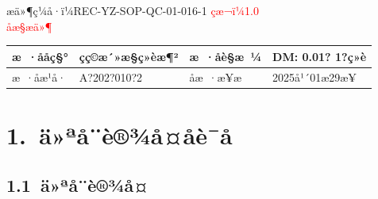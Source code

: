 \documentclass[UTF8,10pt,a4paper,fontset=fandol]{ctexart}
\renewcommand{\arraystretch}{1.15}
\newcommand{\fieldvalue}[1]{#1}
\newcommand{\handwritten}[1]{#1}
\begin{document}
\begin{center}
\begin{center}
\noindent
æä»¶ç¼å·ï¼REC-YZ-SOP-QC-01-016-1 \hfill
\textcolor{red}{çæ¬ï¼1.0}\\
\textcolor{red}{åæ§æä»¶}

\renewcommand{\arraystretch}{1.25}

\noindent
\begin{tabularx}{\textwidth}{|p{2.2cm}|X|p{2.2cm}|X|}
\hline
æ ·ååç§° &
\fieldvalue{\handwritten{çç©æ´»æ§ç»èæ¶²}} &
æ ·åè§æ ¼ &
\fieldvalue{\handwritten{DM: 0.01? 1?ç»è}}\\
\hline
æ ·åæ¹å· &
\fieldvalue{\handwritten{A?202?010?2}} &
åæ ·æ¥æ &
\fieldvalue{\handwritten{2025å¹´01æ29æ¥}}\\
\hline
\end{tabularx}

\section*{1.\ ä»ªå¨è®¾å¤åè¯å}

\subsection*{1.1\ ä»ªå¨è®¾å¤}


\end{center}
\end{center}
\end{document}
